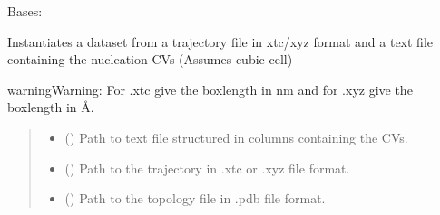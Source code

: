 \documentclass[a4paper,10pt,english]{report}
\begin{document}
\begin{fulllineitems}
\label{\detokenize{NNucleate:NNucleate.dataset.CVTrajectory}}
\pysigstartsignatures
{}
\pysigstopsignatures
\sphinxAtStartPar
Bases: 

\sphinxAtStartPar
Instantiates a dataset from a trajectory file in xtc/xyz format and a text file containing the nucleation CVs (Assumes cubic cell)

\begin{sphinxadmonition}{warning}{Warning:}
\sphinxAtStartPar
For .xtc give the boxlength in nm and for .xyz give the boxlength in Å.
\end{sphinxadmonition}
\begin{quote}\begin{description}
\begin{itemize}
\item {} 
\sphinxAtStartPar
{} () \textendash{} Path to text file structured in columns containing the CVs.

\item {} 
\sphinxAtStartPar
{} () \textendash{} Path to the trajectory in .xtc or .xyz file format.

\item {} 
\sphinxAtStartPar
{} () \textendash{} Path to the topology file in .pdb file format.


\end{itemize}
\end{description}
\end{quote}
\end{fulllineitems}
\end{document}
